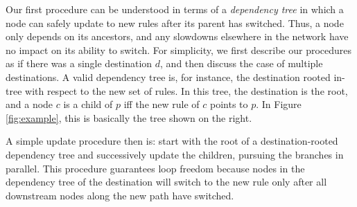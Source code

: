Our first procedure can be understood in terms of a {\em dependency tree} in which a node can safely update to new rules after its parent has switched. Thus, a node only depends on its ancestors, and any slowdowns elsewhere in the network have no impact on its ability to switch.
For simplicity, we first describe our procedures as if there was a single destination $d$, and then discuss the case of multiple destinations. A valid dependency tree is, for instance, the destination rooted in-tree with respect to the new set of rules. In this tree, the destination is the root, and a node $c$ is a child of $p$ iff the new rule of $c$ points to $p$. In Figure \ref{fig:example}, this is basically the tree shown on the right.

A simple update procedure then is: start with the root of a destination-rooted dependency tree and successively update the children, pursuing the branches in parallel.
This procedure guarantees loop freedom because nodes in the dependency tree of the destination will switch to the new rule only after all downstream nodes along the new path have switched.









